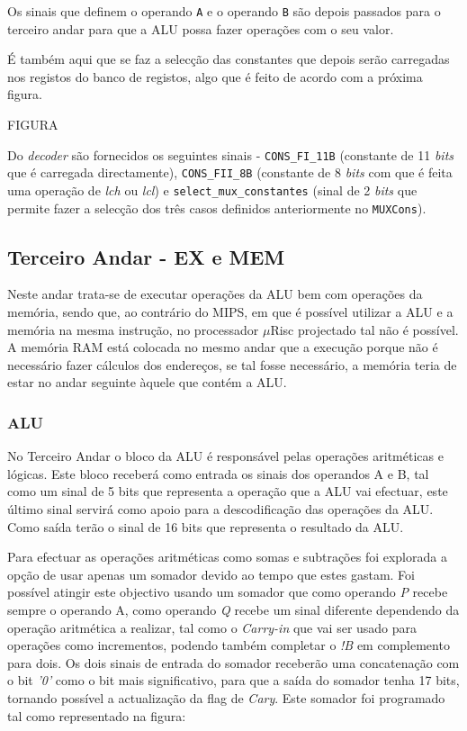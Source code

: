 \documentclass[11pt]{article}
\numberwithin{equation}{section}
\begin{document}

Os sinais que definem o operando \texttt{A} e o operando \texttt{B} são depois passados para o terceiro andar para que a ALU possa fazer operações com o seu valor.

É também aqui que se faz a selecção das constantes que depois serão carregadas nos registos do banco de registos, algo que é feito de acordo com a próxima figura.

FIGURA

Do \textit{decoder} são fornecidos os seguintes sinais - \texttt{CONS\_FI\_11B} (constante de 11 \textit{bits} que é carregada directamente), \texttt{CONS\_FII\_8B} (constante de 8 \textit{bits} com que é feita uma operação de \textit{lch} ou \textit{lcl}) e \texttt{select\_mux\_constantes}  (sinal de 2 \textit{bits} que permite fazer a selecção dos três casos definidos anteriormente no \texttt{MUXCons}).

\subsection{Terceiro Andar - EX e MEM}

Neste andar trata-se de executar operações da ALU bem com operações da memória, sendo que, ao contrário do MIPS, em que é possível utilizar a ALU e a memória na mesma instrução, no processador $\mu$Risc projectado tal não é possível. A memória RAM está colocada no mesmo andar que a execução porque não é necessário fazer cálculos dos endereços, se tal fosse necessário, a memória teria de estar no andar seguinte àquele que contém a ALU. 

\subsubsection{ALU}

No Terceiro Andar o bloco da ALU é responsável pelas operações aritméticas e lógicas. Este bloco receberá como entrada os sinais dos operandos A e B, tal como um sinal de 5 bits que representa a operação que a ALU vai efectuar, este último sinal servirá como apoio para a descodificação das operações da ALU. Como saída terão o sinal de 16 bits que representa o resultado da ALU.

Para efectuar as operações aritméticas como somas e subtrações foi explorada a opção de usar apenas um somador devido ao tempo que estes gastam. Foi possível atingir este objectivo usando um somador que como operando \textit{P} recebe sempre o operando A, como operando \textit{Q} recebe um sinal diferente dependendo da operação aritmética a realizar, tal como o \textit{Carry-in} que vai ser usado para operações como incrementos, podendo também completar o \textit{!B} em complemento para dois. Os dois sinais de entrada do somador receberão uma concatenação com o bit \textit{'0'} como o bit mais significativo, para que a saída do somador  tenha 17 bits, tornando possível a actualização da flag de \textit{Cary}. Este somador foi programado tal como representado na figura:
\end{document}
